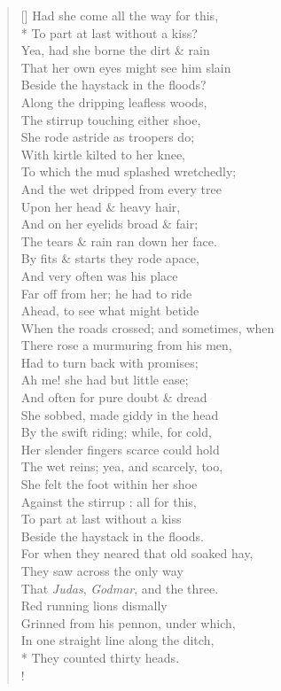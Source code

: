 \documentclass[MAIN]{subfiles}
\begin{document}
\settowidth{\versewidth}{Had she come all the way for this,}
\begin{verse}[\versewidth]
Had she come all the way for this,\\*
To part at last without a kiss?\\
Yea, had she borne the dirt \& rain\\
That her own eyes might see him slain\\
Beside the haystack in the floods?\\
Along the dripping leafless woods,\\
The stirrup touching either shoe,\\
She rode astride as troopers do;\\
With kirtle kilted to her knee,\\
To which the mud splashed wretchedly;\\
And the wet dripped from every tree\\
Upon her head \& heavy hair,\\
And on her eyelids broad \& fair;\\
The tears \& rain ran down her face.\\
By fits \& starts they rode apace,\\
And very often was his place\\
Far off from her; he had to ride\\
Ahead, to see what might betide\\
When the roads crossed; and sometimes, when\\
There rose a murmuring from his men,\\
Had to turn back with promises;\\
Ah me! she had but little ease;\\
And often for pure doubt \& dread\\
She sobbed, made giddy in the head\\
By the swift riding; while, for cold,\\
Her slender fingers scarce could hold\\
The wet reins; yea, and scarcely, too,\\
She felt the foot within her shoe\\
Against the stirrup : all for this,\\
To part at last without a kiss\\
Beside the haystack in the floods.\\
For when they neared that old soaked hay,\\
They saw across the only way\\
That \emph{Judas}, \emph{Godmar}, and the three.\\
Red running lions dismally\\
Grinned from his pennon, under which,\\
In one straight line along the ditch,\\*
They counted thirty heads.\\!


\end{verse}
\end{document}
